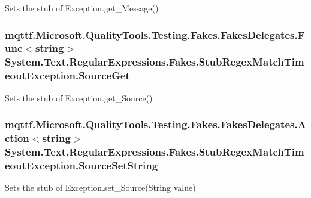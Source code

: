 Sets the stub of Exception.\-get\-\_\-\-Message()

\hypertarget{class_system_1_1_text_1_1_regular_expressions_1_1_fakes_1_1_stub_regex_match_timeout_exception_ac6650c265bebe01a77e1dad540a6b8fc}{
\subsubsection[{Source\-Get}]{\setlength{\rightskip}{0pt plus 5cm}mqttf.\-Microsoft.\-Quality\-Tools.\-Testing.\-Fakes.\-Fakes\-Delegates.\-Func$<$string$>$ System.\-Text.\-Regular\-Expressions.\-Fakes.\-Stub\-Regex\-Match\-Timeout\-Exception.\-Source\-Get}}\label{class_system_1_1_text_1_1_regular_expressions_1_1_fakes_1_1_stub_regex_match_timeout_exception_ac6650c265bebe01a77e1dad540a6b8fc}


Sets the stub of Exception.\-get\-\_\-\-Source()

\hypertarget{class_system_1_1_text_1_1_regular_expressions_1_1_fakes_1_1_stub_regex_match_timeout_exception_ad7cfbf46c29e81ffd36b8464fb4795cc}{
\subsubsection[{Source\-Set\-String}]{\setlength{\rightskip}{0pt plus 5cm}mqttf.\-Microsoft.\-Quality\-Tools.\-Testing.\-Fakes.\-Fakes\-Delegates.\-Action$<$string$>$ System.\-Text.\-Regular\-Expressions.\-Fakes.\-Stub\-Regex\-Match\-Timeout\-Exception.\-Source\-Set\-String}}\label{class_system_1_1_text_1_1_regular_expressions_1_1_fakes_1_1_stub_regex_match_timeout_exception_ad7cfbf46c29e81ffd36b8464fb4795cc}


Sets the stub of Exception.\-set\-\_\-\-Source(\-String value)

